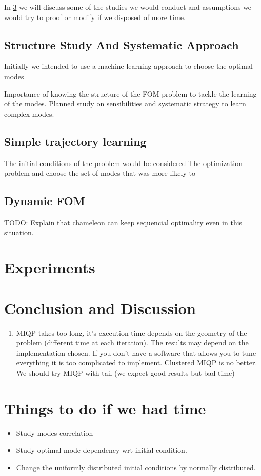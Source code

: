 \documentclass[12,twoside]{TFG-GM}
\theoremstyle{definition}
\theoremstyle{remark}
\begin{document}
In \ref{sec:todo} we will discuss some of the studies we would conduct and assumptions we would try to proof or modify if we disposed of more time.

\subsection{Structure Study And Systematic Approach}
\label{subsec:structure}
Initially we intended to use a machine learning approach to choose the optimal modes 

Importance of knowing the structure of the FOM problem to tackle the learning of the modes. Planned study on sensibilities and systematic strategy to learn complex modes.

\subsection{Simple trajectory learning}
\label{subsec:learningsimple}
The initial conditions of the problem would be considered The optimization problem and choose the set of modes that was more likely to 

\subsection{Dynamic FOM}
TODO: Explain that chameleon can keep sequencial optimality even in this situation.

\section{Experiments}
\label{sec:experiments}

\section{Conclusion and Discussion}
\label{sec:conclusion}
\begin{enumerate}
\item{MIQP} takes too long, it's execution time depends on the geometry of the problem (different time at each iteration). The results may depend on the implementation chosen. If you don't have a software that allows you to tune everything it is too complicated to implement. Clustered MIQP is no better. We should try MIQP with tail (we expect good results but bad time)
\end{enumerate}

\section{Things to do if we had time}
\label{sec:todo}
\begin{itemize}
\item Study modes correlation
\item Study optimal mode dependency wrt initial condition.
\item Change the uniformly distributed initial conditions by normally distributed.
\end{itemize}
\end{document}
